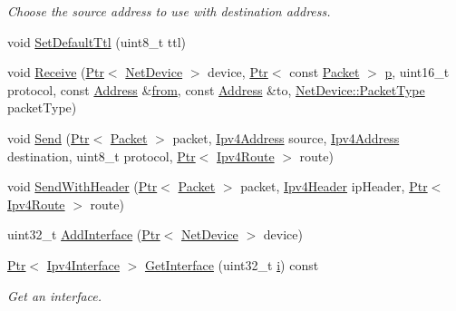 \begin{DoxyCompactItemize}
\begin{DoxyCompactList}\small\item\em Choose the source address to use with destination address. \end{DoxyCompactList}\item 
void \hyperlink{classns3_1_1Ipv4L3Protocol_ae8e813f03f1d862bd18cede2b12d346f}{Set\+Default\+Ttl} (uint8\+\_\+t ttl)
\item 
void \hyperlink{classns3_1_1Ipv4L3Protocol_a2f27fb0a3f698ffb34a654323b063c94}{Receive} (\hyperlink{classns3_1_1Ptr}{Ptr}$<$ \hyperlink{classns3_1_1NetDevice}{Net\+Device} $>$ device, \hyperlink{classns3_1_1Ptr}{Ptr}$<$ const \hyperlink{classns3_1_1Packet}{Packet} $>$ \hyperlink{lte__link__budget__x2__handover__measures_8m_ac9de518908a968428863f829398a4e62}{p}, uint16\+\_\+t protocol, const \hyperlink{classns3_1_1Address}{Address} \&\hyperlink{lte__amc_8m_a1b4c81ff74eb1a626b5ade44c81004b3}{from}, const \hyperlink{classns3_1_1Address}{Address} \&to, \hyperlink{classns3_1_1NetDevice_ace65153f09144f55a0d3e702fc29d6b2}{Net\+Device\+::\+Packet\+Type} packet\+Type)
\item 
void \hyperlink{classns3_1_1Ipv4L3Protocol_abe8cf785815f3fbb32b0e21d629be641}{Send} (\hyperlink{classns3_1_1Ptr}{Ptr}$<$ \hyperlink{classns3_1_1Packet}{Packet} $>$ packet, \hyperlink{classns3_1_1Ipv4Address}{Ipv4\+Address} source, \hyperlink{classns3_1_1Ipv4Address}{Ipv4\+Address} destination, uint8\+\_\+t protocol, \hyperlink{classns3_1_1Ptr}{Ptr}$<$ \hyperlink{classns3_1_1Ipv4Route}{Ipv4\+Route} $>$ route)
\item 
void \hyperlink{classns3_1_1Ipv4L3Protocol_a9305010252cee1e4e97766227ca58ba4}{Send\+With\+Header} (\hyperlink{classns3_1_1Ptr}{Ptr}$<$ \hyperlink{classns3_1_1Packet}{Packet} $>$ packet, \hyperlink{classns3_1_1Ipv4Header}{Ipv4\+Header} ip\+Header, \hyperlink{classns3_1_1Ptr}{Ptr}$<$ \hyperlink{classns3_1_1Ipv4Route}{Ipv4\+Route} $>$ route)
\item 
uint32\+\_\+t \hyperlink{classns3_1_1Ipv4L3Protocol_ac6855eb39254f74fa30e7f23a7b100db}{Add\+Interface} (\hyperlink{classns3_1_1Ptr}{Ptr}$<$ \hyperlink{classns3_1_1NetDevice}{Net\+Device} $>$ device)
\item 
\hyperlink{classns3_1_1Ptr}{Ptr}$<$ \hyperlink{classns3_1_1Ipv4Interface}{Ipv4\+Interface} $>$ \hyperlink{classns3_1_1Ipv4L3Protocol_ad58abef6f890f3cc2cf291159a3b8588}{Get\+Interface} (uint32\+\_\+t \hyperlink{lte__uplink__power__control_8m_a6f6ccfcf58b31cb6412107d9d5281426}{i}) const 
\begin{DoxyCompactList}\small\item\em Get an interface. \end{DoxyCompactList}\item 

\end{DoxyCompactItemize}
